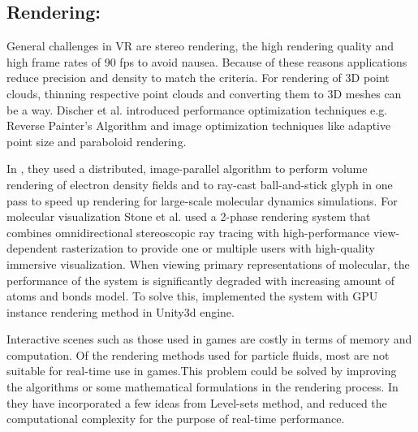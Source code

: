 \documentclass[10pt,twocolumn,letterpaper]{article}
\begin{document}
\subsection{Rendering:}
General challenges in VR are stereo rendering, the high rendering quality and high frame rates of 90 fps to avoid nausea. Because of these reasons applications reduce precision and density to match the criteria. For rendering of 3D point clouds, thinning respective point clouds \cite{peters2016robust} and converting them to 3D meshes \cite{berger2017survey} can be a way. Discher et al. \cite{discher_point-based_2018} introduced performance optimization techniques e.g. Reverse Painter’s Algorithm and image optimization techniques like adaptive point size and paraboloid rendering. 

 In \cite{reda_visualizing_2013} , they used a distributed, image-parallel algorithm to perform volume rendering of electron density fields and to ray-cast ball-and-stick glyph in one pass to speed up rendering for large-scale molecular dynamics simulations. For molecular visualization Stone et al. \cite{stone_immersive_2016} used a 2-phase rendering system that combines omnidirectional stereoscopic ray tracing with high-performance view-dependent rasterization to provide one or multiple users with high-quality immersive visualization. When viewing primary representations of molecular, the performance of the system is significantly degraded with increasing amount of atoms and bonds model. To solve this, \cite{Wiebrands2018} implemented the system with GPU instance rendering method in Unity3d engine. 

Interactive scenes such as those used in games are costly in terms of memory and computation. Of the rendering methods used for particle fluids, most are not suitable for real-time use in games.This problem could be solved by improving the algorithms or some mathematical formulations in the rendering process. In \cite{VanderLaan2009} they have incorporated a few ideas from Level-sets method, and reduced the computational complexity for the purpose of real-time performance.



\end{document}
